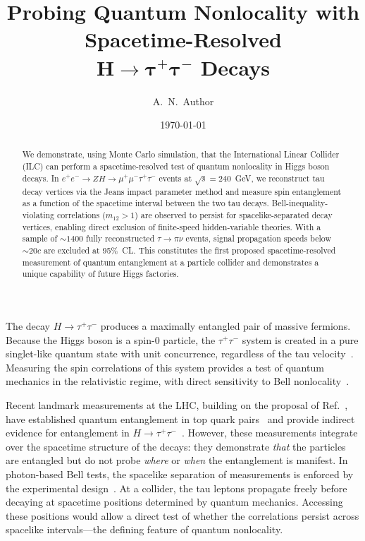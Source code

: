 \documentclass[prl,twocolumn,superscriptaddress,floatfix]{revtex4-2}
\newcommand{\ee}{e^+e^-}
\newcommand{\tautau}{\tau^+\tau^-}
\newcommand{\mumu}{\mu^+\mu^-}
\newcommand{\pinu}{\pi\nu}
\newcommand{\Htautau}{H\!\to\!\tautau}
\newcommand{\mtwo}{m_{12}}
\newcommand{\sqrts}{\sqrt{s}}
\begin{document}
\title{Probing Quantum Nonlocality with Spacetime-Resolved\\
  \texorpdfstring{$\bm{H\!\to\!\tau^+\tau^-}$}{H -> tau+tau-} Decays}

\author{A.~N.~Author}

\date{\today}

\begin{abstract}
We demonstrate, using Monte Carlo simulation, that the International
Linear Collider (ILC) can perform a spacetime-resolved test of quantum
nonlocality in Higgs boson decays.  In
$\ee\!\to\!ZH\!\to\!\mumu\tautau$ events at $\sqrts=240$~GeV,
we reconstruct tau decay vertices via the Jeans impact parameter
method and measure spin entanglement as a function of the spacetime
interval between the two tau decays.
Bell-inequality-violating correlations ($\mtwo>1$) are observed
to persist for spacelike-separated decay vertices, enabling direct
exclusion of finite-speed hidden-variable theories.
With a sample of ${\sim}1400$ fully reconstructed $\tau\!\to\!\pinu$
events, signal propagation speeds below ${\sim}20c$ are excluded at
95\%~CL. This constitutes the first proposed spacetime-resolved
measurement of quantum entanglement at a particle collider and
demonstrates a unique capability of future Higgs factories.
\end{abstract}

\maketitle


The decay $\Htautau$ produces a maximally entangled pair of massive
fermions.  Because the Higgs boson is a spin-0 particle, the
$\tautau$ system is created in a pure singlet-like quantum state with
unit concurrence, regardless of the tau velocity~\cite{Fabbrichesi2022,Barr2024}.
Measuring the spin correlations of this system provides a test of
quantum mechanics in the relativistic regime, with direct sensitivity
to Bell nonlocality~\cite{EPR1935,Bell1964,CHSH1969}.

Recent landmark measurements at the
LHC, building on the proposal of Ref.~\cite{Afik2021}, have
established quantum entanglement in top quark
pairs~\cite{ATLAS_top2024,CMS_top2024} and provide indirect evidence
for entanglement in $\Htautau$~\cite{ATLAS_Htautau2024}.  However,
these measurements integrate over the spacetime structure of the
decays: they demonstrate \emph{that} the particles are entangled but
do not probe \emph{where} or \emph{when} the entanglement is manifest.
In photon-based Bell tests, the spacelike separation of measurements
is enforced by the experimental design~\cite{Aspect1982,Hensen2015,BigBell2018}.
At a collider, the tau leptons propagate freely before decaying at
spacetime positions determined by quantum mechanics.  Accessing these
positions would allow a direct test of whether the correlations
persist across spacelike intervals---the defining feature of quantum
nonlocality.
\end{document}
